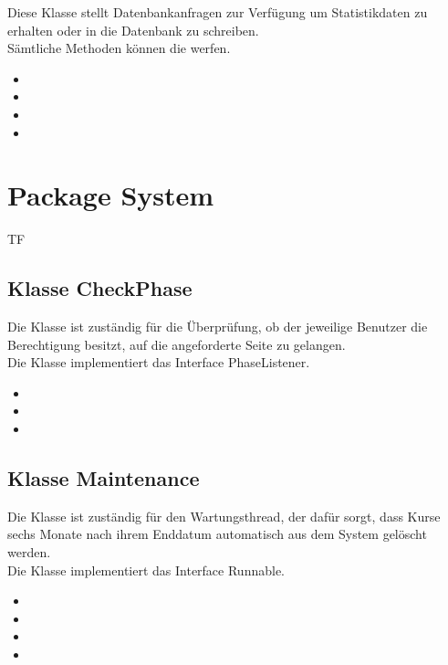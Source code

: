 		Diese Klasse stellt Datenbankanfragen zur Verfügung um Statistikdaten zu erhalten oder in die Datenbank
		zu schreiben.\\
		Sämtliche Methoden können die  werfen.
		\begin{itemize}
			\item {}
			\item {}
			\item {}
			\item {}
		\end{itemize}
	
	\section{Package System}
	\begin{tiny}
		TF
	\end{tiny}
	\subsection{Klasse CheckPhase}
	Die Klasse ist zuständig für die Überprüfung, ob der jeweilige Benutzer die Berechtigung besitzt, auf die angeforderte Seite zu gelangen.\\
	Die Klasse implementiert das Interface PhaseListener.
	\begin{itemize}
		\item {}
		\item \override
		\item \override
	\end{itemize}
	
	\subsection{Klasse Maintenance}
	Die Klasse ist zuständig für den Wartungsthread, der dafür sorgt, dass Kurse sechs Monate nach ihrem Enddatum automatisch aus dem System gelöscht werden.\\
	Die Klasse implementiert das Interface Runnable.
	\begin{itemize}
		\item {}
		\item {}
		\item {}
		\item \override
	\end{itemize}
	
